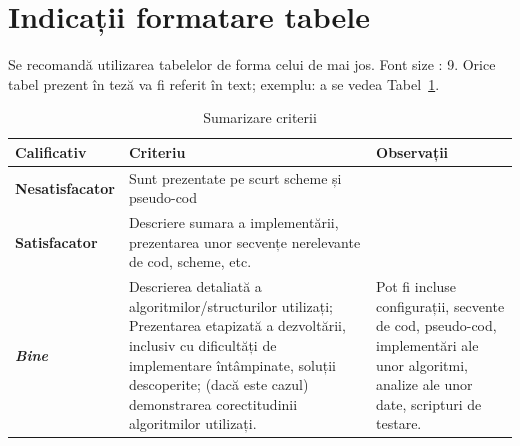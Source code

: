 \documentclass[12pt,a4paper]{report}
\begin{document}
\section{Indicații formatare tabele}
Se recomandă utilizarea tabelelor de forma celui de mai jos.  Font size :  9.
Orice tabel prezent în teză va fi referit în text; exemplu: a se vedea Tabel~\ref{tab:criterii}.

\begin{table}[th]\small\linespread{1}
	\caption{Sumarizare criterii}
	\label{tab:criterii}
	\begin{tabular}{l >{\raggedright\arraybackslash}p{8cm} >{\raggedright\arraybackslash}p{4cm}}
		\textbf{Calificativ}    & \textbf{Criteriu}                                                                                                                                                                                                                                & \textbf{Observații}                                                                                                                     \\\hline
		\textbf{Nesatisfacator} & Sunt prezentate pe scurt scheme și pseudo-cod                                                                                                                                                                                                    &                                                                                                                                         \\\hline
		\textbf{Satisfacator}   & Descriere sumara a implementării, prezentarea unor secvențe nerelevante de cod, scheme, etc.                                                                                                                                                     &                                                                                                                                         \\
		\hline
		\textbf{\textit{Bine}}  & Descrierea detaliată a algoritmilor/structurilor utilizați; Prezentarea etapizată a dezvoltării, inclusiv cu dificultăți de implementare întâmpinate, soluții descoperite; (dacă este cazul) demonstrarea corectitudinii algoritmilor utilizați. & Pot fi incluse configurații, secvente de cod, pseudo-cod, implementări ale unor algoritmi, analize ale unor date, scripturi de testare. \\
		\hline
	\end{tabular}
\end{table}
\end{document}
